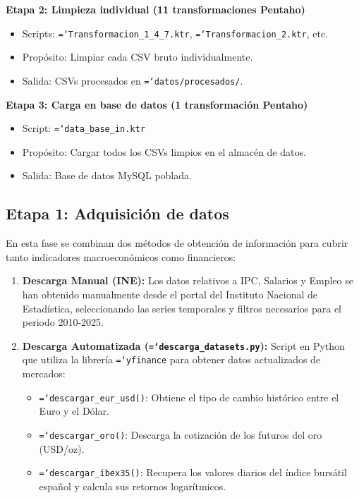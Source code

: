 \documentclass{article}
\let\oldtexttt\texttt  %
\renewcommand{\texttt}[1]{{\footnotesize\oldtexttt{\hyphenchar\font=`\-#1}}}  %
\begin{document}
\textbf{Etapa 2: Limpieza individual (11 transformaciones Pentaho)}
\begin{itemize}
    \item Scripts: \texttt{Transformacion\_1\_4\_7.ktr}, \texttt{Transformacion\_2.ktr}, etc.
    \item Prop\'osito: Limpiar cada CSV bruto individualmente.
    \item Salida: CSVs procesados en \texttt{datos/procesados/}.
\end{itemize}

\textbf{Etapa 3: Carga en base de datos (1 transformaci\'on Pentaho)}
\begin{itemize}
    \item Script: \texttt{data\_base\_in.ktr}
    \item Prop\'osito: Cargar todos los CSVs limpios en el almac\'en de datos.
    \item Salida: Base de datos MySQL poblada.
\end{itemize}

\subsection{Etapa 1: Adquisici\'on de datos}

En esta fase se combinan dos m\'etodos de obtenci\'on de informaci\'on para cubrir tanto indicadores macroecon\'omicos como financieros:

\begin{enumerate}
    \item \textbf{Descarga Manual (INE):} Los datos relativos a IPC, Salarios y Empleo se han obtenido manualmente desde el portal del Instituto Nacional de Estad\'istica, seleccionando las series temporales y filtros necesarios para el periodo 2010-2025.
    \item \textbf{Descarga Automatizada (\texttt{descarga\_datasets.py}):} Script en Python que utiliza la librer\'ia \texttt{yfinance} para obtener datos actualizados de mercados:
    \begin{itemize}
        \item \texttt{descargar\_eur\_usd()}: Obtiene el tipo de cambio hist\'orico entre el Euro y el D\'olar.
        \item \texttt{descargar\_oro()}: Descarga la cotizaci\'on de los futuros del oro (USD/oz).
        \item \texttt{descargar\_ibex35()}: Recupera los valores diarios del \'indice burs\'atil espa\~nol y calcula sus retornos logar\'itmicos.
    \end{itemize}
\end{enumerate}
\end{document}
